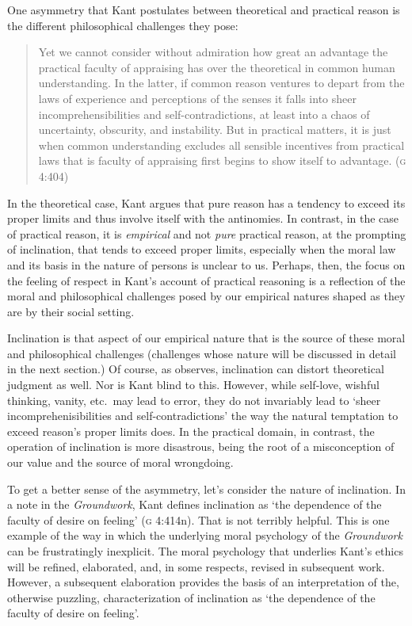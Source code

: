 \documentclass[12pt]{article}
\begin{document}

One asymmetry that Kant postulates between theoretical and practical reason is the different philosophical challenges they pose: 
\begin{quote}
    Yet we cannot consider without admiration how great an advantage the practical faculty of appraising has over the theoretical in common human understanding. In the latter, if common reason ventures to depart from the laws of experience and perceptions of the senses it falls into sheer incomprehensibilities and self-contradictions, at least into a chaos of uncertainty, obscurity, and instability. But in practical matters, it is just when common understanding excludes all sensible incentives from practical laws that is faculty of appraising first begins to show itself to advantage. (\textsc{g} 4:404)
\end{quote}
In the theoretical case, Kant argues that pure reason has a tendency to exceed its proper limits and thus involve itself with the antinomies. In contrast, in the case of practical reason, it is \emph{empirical} and not \emph{pure} practical reason, at the prompting of inclination, that tends to exceed proper limits, especially when the moral law and its basis in the nature of persons is unclear to us. Perhaps, then, the focus on the feeling of respect in Kant's account of practical reasoning is a reflection of the moral and philosophical challenges posed by our empirical natures shaped as they are by their social setting. 

Inclination is that aspect of our empirical nature that is the source of these moral and philosophical challenges (challenges whose nature will be discussed in detail in the next section.) Of course, as \citet[133]{Raz:2001ps} observes, inclination can distort theoretical judgment as well. Nor is Kant blind to this. However, while self-love, wishful thinking, vanity, etc.\ may lead to error, they do not invariably lead to `sheer incomprehenisibilities and self-contradictions' the way the natural temptation to exceed reason's proper limits does. In the practical domain, in contrast, the operation of inclination is more disastrous, being the root of a misconception of our value and the source of moral wrongdoing.

To get a better sense of the asymmetry, let's consider the nature of inclination. In a note in the \emph{Groundwork}, Kant defines inclination as `the dependence of the faculty of desire on feeling' (\textsc{g} 4:414n). That is not terribly helpful. This is one example of the way in which the underlying moral psychology of the \emph{Groundwork} can be frustratingly inexplicit. The moral psychology that underlies Kant's ethics will be refined, elaborated, and, in some respects, revised in subsequent work. However, a subsequent elaboration provides the basis of an interpretation of the, otherwise puzzling, characterization of inclination as `the dependence of the faculty of desire on feeling'.
\end{document}
